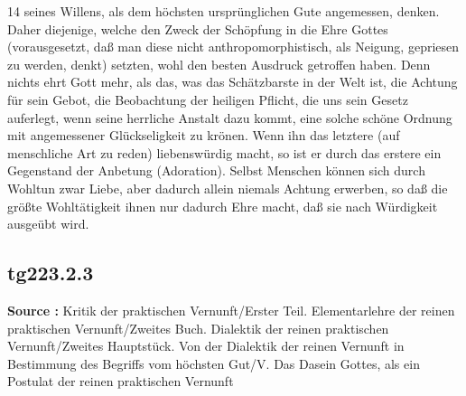 \documentclass[a4paper,12pt,twoside]{book}
\begin{document}
	
	
	14
	seines Willens, als dem höchsten ursprünglichen Gute angemessen, denken. Daher diejenige, welche den Zweck der Schöpfung in die Ehre Gottes (vorausgesetzt, daß man diese nicht anthropomorphistisch, als Neigung, gepriesen zu werden, denkt) setzten, wohl den besten Ausdruck getroffen haben. Denn nichts ehrt Gott mehr, als das, was das Schätzbarste in der Welt ist, die Achtung für sein Gebot, die Beobachtung der heiligen Pflicht, die uns sein Gesetz auferlegt, wenn seine herrliche Anstalt dazu kommt, eine solche schöne Ordnung mit angemessener Glückseligkeit zu krönen. Wenn ihn das letztere (auf menschliche Art zu reden) liebenswürdig macht, so ist er durch das erstere ein Gegenstand der Anbetung (Adoration). Selbst Menschen können sich durch Wohltun zwar Liebe, aber dadurch allein niemals Achtung erwerben, so daß die größte Wohltätigkeit ihnen nur dadurch Ehre macht, daß sie nach Würdigkeit ausgeübt wird. 
	
	\subsection*{tg223.2.3} 
	\textbf{Source : }Kritik der praktischen Vernunft/Erster Teil. Elementarlehre der reinen praktischen Vernunft/Zweites Buch. Dialektik der reinen praktischen Vernunft/Zweites Hauptstück. Von der Dialektik der reinen Vernunft in Bestimmung des Begriffs vom höchsten Gut/V. Das Dasein Gottes, als ein Postulat der reinen praktischen Vernunft\\  
	
\end{document}
